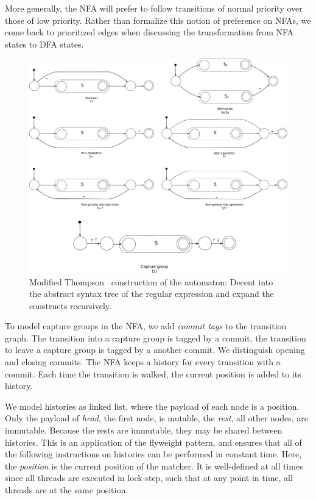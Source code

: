 \documentclass[english]{sigplanconf}
\theoremstyle{definition}
\begin{document}
More generally, the NFA will prefer to follow transitions of normal
priority over those of low priority. Rather than formalize this
notion of preference on NFAs, we come back to prioritized edges when
discussing the transformation from NFA states to DFA states.


\begin{figure}[tb]
\includegraphics[width=\linewidth]{graphs/thompson}
\caption{Modified Thompson~\cite{Thom68a} construction of the automaton: Decent into the abstract syntax tree of the regular expression and expand the constructs recursively.}
\label{fig:thompson-construction}
\end{figure}

To model capture groups in the NFA, we add \emph{commit tags} to the
transition graph. The transition into a capture group is tagged by a
commit, the transition to leave a capture group is tagged by a another
commit. We distinguish opening and closing commits. The NFA keeps a
history for every transition with a commit. Each time the transition
is walked, the current position is added to its history. 

We model histories as linked list, where the payload of each node
is a position.  Only the payload of \emph{head}, the first node,
is mutable, the \emph{rest}, all other nodes, are immutable.  Because
the rests are immutable, they may be shared between histories.  This
is an application of the flyweight pattern, and ensures that all
of the following instructions on histories can be performed in
constant time. Here, the \emph{position} is the current position
of the matcher.  It is well-defined at all times since all threads
are executed in lock-step, such that at any point in time, all
threads are at the same position.
\end{document}
